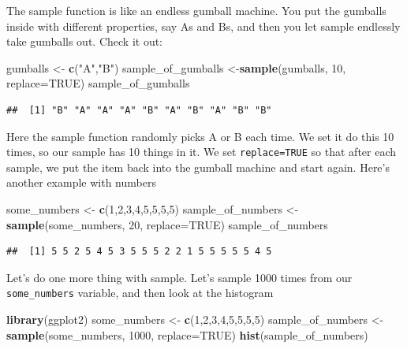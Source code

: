 \documentclass[]{book}
\newenvironment{Shaded}{\begin{snugshade}}{\end{snugshade}}
\newcommand{\KeywordTok}[1]{\textcolor[rgb]{0.13,0.29,0.53}{\textbf{{#1}}}}
\newcommand{\DataTypeTok}[1]{\textcolor[rgb]{0.13,0.29,0.53}{{#1}}}
\newcommand{\DecValTok}[1]{\textcolor[rgb]{0.00,0.00,0.81}{{#1}}}
\newcommand{\StringTok}[1]{\textcolor[rgb]{0.31,0.60,0.02}{{#1}}}
\newcommand{\OtherTok}[1]{\textcolor[rgb]{0.56,0.35,0.01}{{#1}}}
\newcommand{\NormalTok}[1]{{#1}}
\theoremstyle{definition}
\theoremstyle{definition}
\theoremstyle{definition}
\theoremstyle{remark}
\begin{document}
The sample function is like an endless gumball machine. You put the
gumballs inside with different properties, say As and Bs, and then you
let sample endlessly take gumballs out. Check it out:

\begin{Shaded}
\begin{Highlighting}[]
\NormalTok{gumballs <-}\StringTok{ }\KeywordTok{c}\NormalTok{(}\StringTok{"A"}\NormalTok{,}\StringTok{"B"}\NormalTok{)}
\NormalTok{sample_of_gumballs <-}\KeywordTok{sample}\NormalTok{(gumballs, }\DecValTok{10}\NormalTok{, }\DataTypeTok{replace=}\OtherTok{TRUE}\NormalTok{)}
\NormalTok{sample_of_gumballs}
\end{Highlighting}
\end{Shaded}

\begin{verbatim}
##  [1] "B" "A" "A" "A" "B" "A" "B" "A" "B" "B"
\end{verbatim}

Here the sample function randomly picks A or B each time. We set it do
this 10 times, so our sample has 10 things in it. We set
\texttt{replace=TRUE} so that after each sample, we put the item back
into the gumball machine and start again. Here's another example with
numbers

\begin{Shaded}
\begin{Highlighting}[]
\NormalTok{some_numbers <-}\StringTok{ }\KeywordTok{c}\NormalTok{(}\DecValTok{1}\NormalTok{,}\DecValTok{2}\NormalTok{,}\DecValTok{3}\NormalTok{,}\DecValTok{4}\NormalTok{,}\DecValTok{5}\NormalTok{,}\DecValTok{5}\NormalTok{,}\DecValTok{5}\NormalTok{,}\DecValTok{5}\NormalTok{)}
\NormalTok{sample_of_numbers <-}\KeywordTok{sample}\NormalTok{(some_numbers, }\DecValTok{20}\NormalTok{, }\DataTypeTok{replace=}\OtherTok{TRUE}\NormalTok{)}
\NormalTok{sample_of_numbers}
\end{Highlighting}
\end{Shaded}

\begin{verbatim}
##  [1] 5 5 2 5 4 5 3 5 5 5 2 2 1 5 5 5 5 5 4 5
\end{verbatim}

Let's do one more thing with sample. Let's sample 1000 times from our
\texttt{some\_numbers} variable, and then look at the histogram

\begin{Shaded}
\begin{Highlighting}[]
\KeywordTok{library}\NormalTok{(ggplot2)}
\NormalTok{some_numbers <-}\StringTok{ }\KeywordTok{c}\NormalTok{(}\DecValTok{1}\NormalTok{,}\DecValTok{2}\NormalTok{,}\DecValTok{3}\NormalTok{,}\DecValTok{4}\NormalTok{,}\DecValTok{5}\NormalTok{,}\DecValTok{5}\NormalTok{,}\DecValTok{5}\NormalTok{,}\DecValTok{5}\NormalTok{)}
\NormalTok{sample_of_numbers <-}\KeywordTok{sample}\NormalTok{(some_numbers, }\DecValTok{1000}\NormalTok{, }\DataTypeTok{replace=}\OtherTok{TRUE}\NormalTok{)}
\KeywordTok{hist}\NormalTok{(sample_of_numbers)}
\end{Highlighting}
\end{Shaded}
\end{document}
